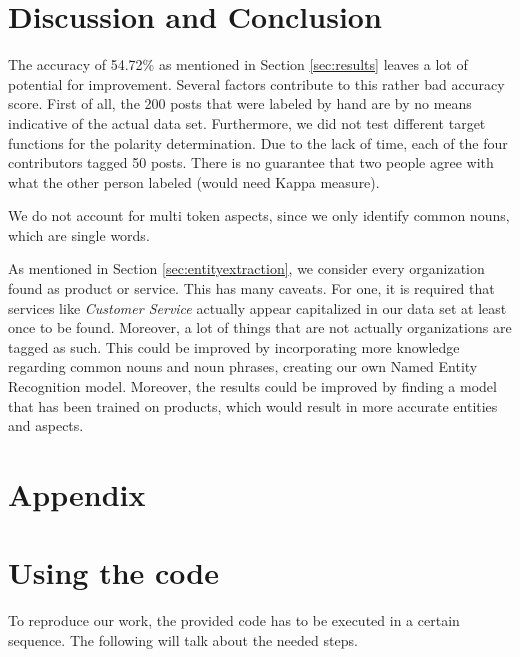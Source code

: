 \documentclass[10pt,a4paper]{article}
\begin{document}
	\section{Discussion and Conclusion}
	The accuracy of 54.72\% as mentioned in Section \ref{sec:results} leaves a lot of potential for improvement. Several factors contribute to this rather bad accuracy score. First of all, the 200 posts that were labeled by hand are by no means indicative of the actual data set. Furthermore, we did not test different target functions for the polarity determination. Due to the lack of time, each of the four contributors tagged 50 posts. There is no guarantee that two people agree with what the other person labeled (would need Kappa measure). 

	We do not account for multi token aspects, since we only identify common nouns, which are single words.

	As mentioned in Section \ref{sec:entityextraction}, we consider every organization found as product or service. This has many caveats. For one, it is required that services like \textit{Customer Service} actually appear capitalized in our data set at least once to be found. Moreover, a lot of things that are not actually organizations are tagged as such. This could be improved by incorporating more knowledge regarding common nouns and noun phrases, creating our own Named Entity Recognition model.
	Moreover, the results could be improved by finding a model that has been trained on products, which would result in more accurate entities and aspects.
	
	
	\appendix
	
	\section*{Appendix}
			
	\section{Using the code}
		To reproduce our work, the provided code has to be executed in a certain sequence. The following will talk about the needed steps.

	\newpage
	
		
	
	
\end{document}
